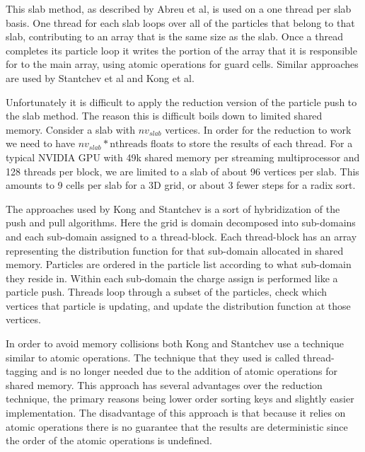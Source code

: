 This slab method, as described by Abreu et al, is used on a one thread per slab basis. One thread for each slab loops over all of the particles that belong to that slab, contributing to an array that is the same size as the slab. Once a thread completes its particle loop it writes the portion of the array that it is responsible for to the main array, using atomic operations for guard cells.\cite{Abreu2011} Similar approaches are used by Stantchev et al and Kong et al.\cite{Stantchev2008}\cite{Kong2011}

Unfortunately it is difficult to apply the reduction version of the particle push to the slab method. The reason this is difficult boils down to limited shared memory. Consider a slab with $nv_{slab}$ vertices. In order for the reduction to work we need to have $nv_{slab} * \mathrm{nthreads}$ floats to store the results of each thread. For a typical NVIDIA GPU with 49k shared memory per streaming multiprocessor and 128 threads per block, we are limited to a slab of about 96 vertices per slab. This amounts to 9 cells per slab for a 3D grid, or about 3 fewer steps for a radix sort.

The approaches used by Kong and Stantchev is a sort of hybridization of the push and pull algorithms. Here the grid is domain decomposed into sub-domains and each sub-domain assigned to a thread-block. Each thread-block has an array representing the distribution function for that sub-domain allocated in shared memory. Particles are ordered in the particle list according to what sub-domain they reside in. Within each sub-domain the charge assign is performed like a particle push. Threads loop through a subset of the particles, check which vertices that particle is updating, and update the distribution function at those vertices. 

In order to avoid memory collisions both Kong and Stantchev use a technique similar to atomic operations. The technique that they used is called thread-tagging and is no longer needed due to the addition of atomic operations for shared memory.\cite{Stantchev2008}\cite{Kong2011} This approach has several advantages over the reduction technique, the primary reasons being lower order sorting keys and slightly easier implementation. The disadvantage of this approach is that because it relies on atomic operations there is no guarantee that the results are deterministic since the order of the atomic operations is undefined. 







